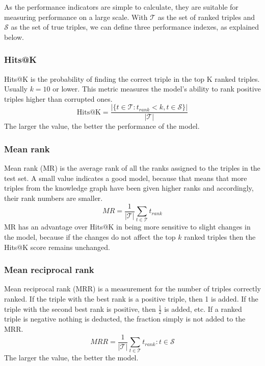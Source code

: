 
As the performance indicators are simple to calculate, they are suitable for measuring performance on a large scale. With $\mathcal{T}$ as the set of ranked triples and $\mathcal{S}$ as the set of true triples, we can define three performance indexes, as explained below.

\subsubsection{Hits@K}
\label{Hits@k}
Hits@K is the probability of finding the correct triple in the top K ranked triples. Usually $k=10$ or lower. This metric measures the model's ability to rank positive triples higher than corrupted ones.
\[\text{Hits@K}=\frac{|\{t\in \mathcal{T} : t_{rank}<k, t \in \mathcal{S}\}|}{|\mathcal{T}|}\]
The larger the value, the better the performance of the model.

\subsubsection{Mean rank}
Mean rank (MR) is the average rank of all the ranks assigned to the triples in the test set. A small value indicates a good model, because that means that more triples from the knowledge graph have been given higher ranks and accordingly, their rank numbers are smaller.
\[MR=\frac{1}{|\mathcal{T}|}\sum_{t\in\mathcal{T}}t_{rank}\]
MR has an advantage over Hits@K in being more sensitive to slight changes in the  model, because if the changes do not affect the top $k$ ranked triples then the Hits@K score remains unchanged.

\subsubsection{Mean reciprocal rank}
Mean reciprocal rank (MRR) is a measurement for the number of triples correctly ranked. If the triple with the best rank is a positive triple, then 1 is added. If the triple with the second best rank is positive, then $\frac{1}{2}$ is added, etc. If a ranked triple is negative nothing is deducted, the fraction simply is not added to the MRR.
\[MRR=\frac{1}{|\mathcal{T}|}\sum_{t\in\mathcal{T}}t_{rank} : t\in \mathcal{S}\]
The larger the value, the better the model.
    
